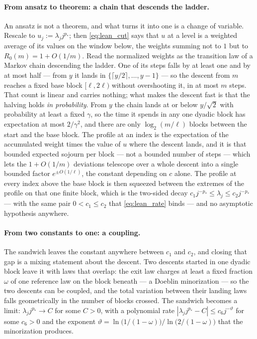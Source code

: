 \paragraph{From ansatz to theorem: a chain that descends the ladder.}
An ansatz is not a theorem, and what turns it into one is a change of variable. Rescale to
$u_j:=\lambda_j j^{p_*}$; then \eqref{eq:lean_cut} says that $u$ at a level is a weighted average
of its values on the window below, the weights summing not to $1$ but to $R_0(m)=1+O(1/m)$.
Read the normalized weights as the transition law of a Markov chain descending the ladder. One
of its steps falls by at least one and by at most half --- from $y$ it lands in
$\{\lceil y/2\rceil,\dots,y-1\}$ --- so the descent from $m$ reaches a fixed base block
$[\ell,2\ell)$ without overshooting it, in at most $m$ steps. That count is linear and carries
nothing; what makes the descent fast is that the halving holds \emph{in probability}. From $y$
the chain lands at or below $y/\sqrt2$ with probability at least a fixed $\gamma$, so the time
it spends in any one dyadic block has expectation at most $2/\gamma^2$, and there are only
$\log_2(m/\ell)$ blocks between the start and the base block. The profile at an index is the
expectation of the accumulated weight times the value of $u$ where the descent lands, and it is
that bounded expected sojourn per block --- not a bounded number of steps --- which lets the
$1+O(1/m)$ deviations telescope over a whole descent into a single bounded factor
$e^{\pm O(1/\ell)}$, the constant depending on $c$ alone. The profile at every index above the
base block is then squeezed between the extremes of the profile on that one finite block, which
is the two-sided decay $c_1 j^{-p_*}\leq\lambda_j\leq c_2 j^{-p_*}$ --- with the same pair
$0<c_1\leq c_2$ that \eqref{eq:lean_rate} binds --- and no asymptotic hypothesis anywhere.

\paragraph{From two constants to one: a coupling.}
The sandwich leaves the constant anywhere between $c_1$ and $c_2$, and closing that gap is a
mixing statement about the descent. Two descents started in one dyadic block leave it with laws
that overlap: the exit law charges at least a fixed fraction $\omega$ of one reference law on
the block beneath --- a Doeblin minorization --- so the two descents can be coupled, and the
total variation between their landing laws falls geometrically in the number of blocks crossed.
The sandwich becomes a limit: $\lambda_j j^{p_*}\rightarrow C$ for some $C>0$, with a
polynomial rate $\left|\lambda_j j^{p_*}-C\right|\leq c_6 j^{-\vartheta}$ for some $c_6>0$ and
the exponent $\vartheta=\ln\bigl(1/(1-\omega)\bigr)/\ln\bigl(2/(1-\omega)\bigr)$ that the
minorization produces.


